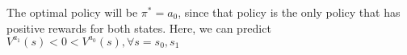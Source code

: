 The optimal policy will be $\pi^* = a_0$, since that policy is the only policy that has positive rewards for both states. Here, we can predict $V^{a_1}(s) < 0 < V^{a_0}(s), \forall s = s_0, s_1$